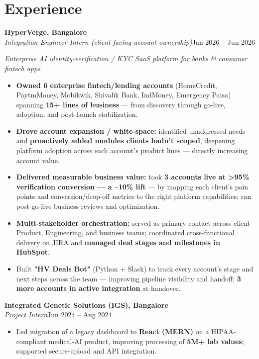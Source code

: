 \documentclass[10pt,a4paper]{article}
\begin{document}
\section*{Experience}
\vspace{1pt}\textbf{HyperVerge, Bangalore}\\
\textit{Integration Engineer Intern \textit{(client-facing account ownership)}}\hfill Jan 2026 -- Jun 2026\par\vspace{1pt}
{\small\itshape Enterprise AI identity-verification / KYC SaaS platform for banks \& consumer fintech apps}\par\vspace{1pt}
\begin{itemize}
\item \textbf{Owned 6 enterprise fintech/lending accounts} (HomeCredit, PaytmMoney, Mobikwik, Shivalik Bank, IndMoney, Emergency Paisa) spanning \textbf{15+ lines of business} --- from discovery through go-live, adoption, and post-launch stabilization.
\item \textbf{Drove account expansion / white-space:} identified unaddressed needs and \textbf{proactively added modules clients hadn't scoped}, deepening platform adoption across each account's product lines --- directly increasing account value.
\item \textbf{Delivered measurable business value:} took \textbf{3 accounts live at \textgreater{}95\% verification conversion --- a \textasciitilde{}10\% lift} --- by mapping each client's pain points and conversion/drop-off metrics to the right platform capabilities; ran post-go-live business reviews and optimization.
\item \textbf{Multi-stakeholder orchestration:} served as primary contact across client Product, Engineering, and business teams; coordinated cross-functional delivery on JIRA and \textbf{managed deal stages and milestones in HubSpot}.
\item Built \textbf{"HV Deals Bot"} (Python + Slack) to track every account's stage and next steps across the team --- improving pipeline visibility and handoff; \textbf{3 more accounts in active integration} at handover.
\end{itemize}
\vspace{1pt}\textbf{Integrated Genetic Solutions (IGS), Bangalore}\\
\textit{Project Intern}\hfill Jun 2024 -- Aug 2024\par\vspace{1pt}
\begin{itemize}
\item Led migration of a legacy dashboard to \textbf{React (MERN)} on a HIPAA-compliant medical-AI product, improving processing of \textbf{5M+ lab values}; supported secure-upload and API integration.
\end{itemize}
\end{document}
